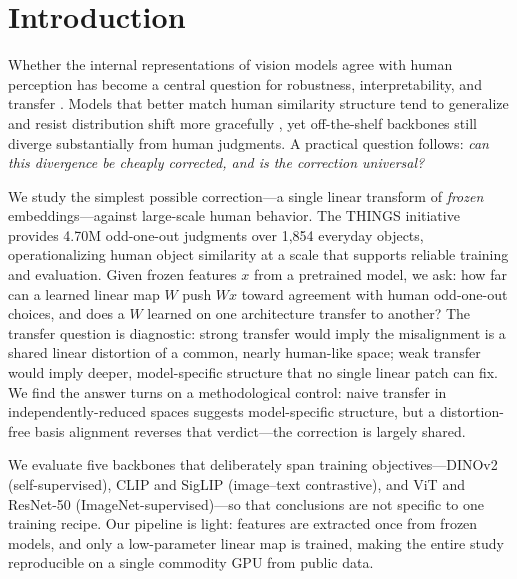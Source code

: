 \documentclass{article}
\begin{document}
\section{Introduction}
Whether the internal representations of vision models agree with human perception
has become a central question for robustness, interpretability, and transfer
\citep{sucholutsky2023alignment,muttenthaler2024aligning}. Models that better
match human similarity structure tend to generalize and resist distribution shift
more gracefully \citep{muttenthaler2024aligning}, yet off-the-shelf backbones
still diverge substantially from human judgments. A practical question follows:
\emph{can this divergence be cheaply corrected, and is the correction universal?}

We study the simplest possible correction---a single linear transform of
\emph{frozen} embeddings---against large-scale human behavior. The THINGS
initiative \citep{hebart2019things,hebart2023things} provides 4.70M odd-one-out
judgments over 1{,}854 everyday objects, operationalizing human object similarity
at a scale that supports reliable training and evaluation. Given frozen features
$x$ from a pretrained model, we ask: how far can a learned linear map $W$ push
$Wx$ toward agreement with human odd-one-out choices, and does a $W$ learned on
one architecture transfer to another? The transfer question is diagnostic: strong
transfer would imply the misalignment is a shared linear distortion of a common,
nearly human-like space; weak transfer would imply deeper, model-specific
structure that no single linear patch can fix. We find the answer turns on a
methodological control: naive transfer in independently-reduced spaces suggests
model-specific structure, but a distortion-free basis alignment reverses that
verdict---the correction is largely shared.

We evaluate five backbones that deliberately span training objectives---DINOv2
(self-supervised), CLIP and SigLIP (image--text contrastive), and ViT and
ResNet-50 (ImageNet-supervised)---so that conclusions are not specific to one
training recipe. Our pipeline is light: features are extracted once from frozen
models, and only a low-parameter linear map is trained, making the entire study
reproducible on a single commodity GPU from public data.
\end{document}
